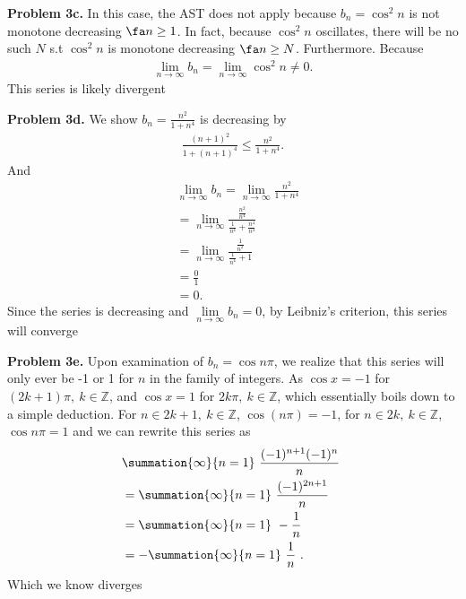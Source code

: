 \documentclass{report}
\begin{document}
    \pagebreak \bigbreak \noindent 
    \textbf{Problem 3c.} In this case, the AST does not apply because $b_n = \cos^{2}{n}$ is not monotone decreasing $\fa n \geq 1$. In fact, because $\cos^{2}{n}$ oscillates, there will be no such $N $ s.t $\cos^{2}{n}$ is monotone decreasing $\fa n \geq N$. Furthermore. Because
    \begin{align*}
        \lim\limits_{n \to \infty}{b_{n}} = \lim\limits_{n \to \infty}{\cos^{2}{n}} \ne 0
    .\end{align*}
    \bigbreak \noindent 
    This series is likely divergent

    \bigbreak \noindent 
    \textbf{Problem 3d.} We show $b_{n} = \frac{n^{2}}{1+n^{4}} $ is decreasing by
    \begin{align*}
        \frac{(n+1)^{2}}{1+(n+1)^{4}} \leq \frac{n^{2}}{1+n^{4}}
    .\end{align*}
    \bigbreak \noindent 
    And
    \begin{align*}
        &\lim\limits_{n \to \infty}{b_{n}} = \lim\limits_{n \to \infty}{\frac{n^{2}}{1+n^{4}}} \\
        &=\lim\limits_{n \to \infty}{\frac{\frac{n^{2}}{n^{4}}}{\frac{1}{n^{4}} + \frac{n^{4}}{n^{4}}} } \\
        &=\lim\limits_{n \to \infty}{\frac{\frac{1}{n^{2}}}{\frac{1}{n^{4}} + 1}} \\
        &= \frac{0}{1} \\
        &=0
    .\end{align*}
    \bigbreak \noindent 
    Since the series is decreasing and $\lim\limits_{n \to \infty}{b_{n}} = 0$, by Leibniz's criterion, this series will converge

    \bigbreak \noindent 
    \textbf{Problem 3e.} Upon examination of $b_n = \cos{n\pi}$, we realize that this series will only ever be -1 or 1 for $n$ in the family of integers. As $\cos{x} = -1$ for $(2k+1)\pi,\ k\in \mathbb{Z}$, and $\cos{x} = 1$ for $2k\pi,\ k\in \mathbb{Z}$, which essentially boils down to a simple deduction. For $n \in 2k+1,\ k\in \mathbb{Z}$, $\cos{(n\pi)} =-1$, for $n\in 2k,\ k\in\mathbb{Z}$, $\cos{n\pi}  = 1$ and we can rewrite this series as 
    \begin{align*}
        &\summation{\infty}{n=1}\ \frac{(-1)^{n+1} (-1)^{n}}{n}\  \\
        &=\summation{\infty}{n=1}\ \frac{(-1)^{2n+1}}{n}\  \\
        &=\summation{\infty}{n=1}\ -\frac{1}{n}\  \\
        &=-\summation{\infty}{n=1}\ \frac{1}{n}\ 
    .\end{align*}
    \bigbreak \noindent 
    Which we know diverges
\end{document}

